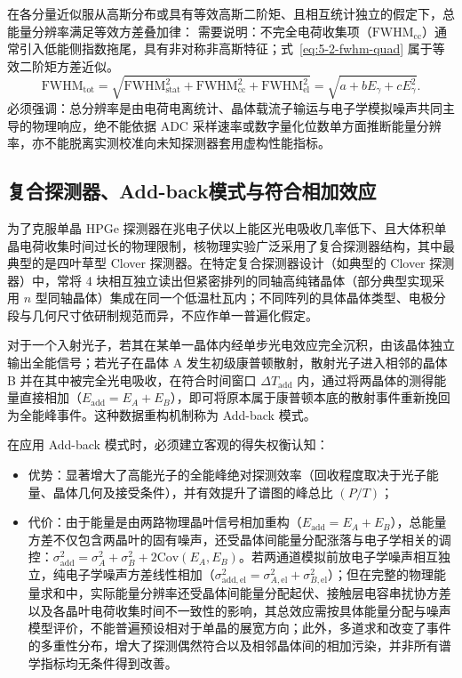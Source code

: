 在各分量近似服从高斯分布或具有等效高斯二阶矩、且相互统计独立的假定下，总能量分辨率满足等效方差叠加律：
需要说明：不完全电荷收集项（$\mathrm{FWHM}_{\mathrm{cc}}$）通常引入低能侧指数拖尾，具有非对称非高斯特征；式~\eqref{eq:5-2-fwhm-quad} 属于等效二阶矩方差近似。
\begin{equation}\label{eq:5-2-fwhm-quad}
\mathrm{FWHM}_{\mathrm{tot}} = \sqrt{\mathrm{FWHM}_{\mathrm{stat}}^2 + \mathrm{FWHM}_{\mathrm{cc}}^2 + \mathrm{FWHM}_{\mathrm{el}}^2} = \sqrt{a + b E_\gamma + c E_\gamma^2}.
\end{equation}
必须强调：总分辨率是由电荷电离统计、晶体载流子输运与电子学模拟噪声共同主导的物理响应，绝不能依据 ADC 采样速率或数字量化位数单方面推断能量分辨率，亦不能脱离实测校准向未知探测器套用虚构性能指标。

\subsection{复合探测器、Add-back模式与符合相加效应}\label{subsec:5-2-4}

为了克服单晶 HPGe 探测器在兆电子伏以上能区光电吸收几率低下、且大体积单晶电荷收集时间过长的物理限制，核物理实验广泛采用了复合探测器结构，其中最典型的是四叶草型 Clover 探测器。在特定复合探测器设计（如典型的 Clover 探测器）中，常将 4 块相互独立读出但紧密排列的同轴高纯锗晶体（部分典型实现采用 $n$ 型同轴晶体）集成在同一个低温杜瓦内；不同阵列的具体晶体类型、电极分段与几何尺寸依研制规范而异，不应作单一普遍化假定。

对于一个入射光子，若其在某单一晶体内经单步光电效应完全沉积，由该晶体独立输出全能信号；若光子在晶体 A 发生初级康普顿散射，散射光子进入相邻的晶体 B 并在其中被完全光电吸收，在符合时间窗口 $\Delta T_{\mathrm{add}}$ 内，通过将两晶体的测得能量直接相加（$E_{\mathrm{add}} = E_A + E_B$），即可将原本属于康普顿本底的散射事件重新挽回为全能峰事件。这种数据重构机制称为 Add-back 模式。

在应用 Add-back 模式时，必须建立客观的得失权衡认知：
\begin{itemize}
\item 优势：显著增大了高能光子的全能峰绝对探测效率（回收程度取决于光子能量、晶体几何及接受条件），并有效提升了谱图的峰总比 $(P/T)$；
\item 代价：由于能量是由两路物理晶叶信号相加重构（$E_{\mathrm{add}} = E_A + E_B$），总能量方差不仅包含两晶叶的固有噪声，还受晶体间能量分配涨落与电子学相关的调控：$\sigma_{\mathrm{add}}^2 = \sigma_A^2 + \sigma_B^2 + 2\mathrm{Cov}(E_A, E_B)$。若两通道模拟前放电子学噪声相互独立，纯电子学噪声方差线性相加（$\sigma_{\mathrm{add, el}}^2 = \sigma_{A, \mathrm{el}}^2 + \sigma_{B, \mathrm{el}}^2$）；但在完整的物理能量求和中，实际能量分辨率还受晶体间能量分配起伏、接触层电容串扰协方差以及各晶叶电荷收集时间不一致性的影响，其总效应需按具体能量分配与噪声模型评价，不能普遍预设相对于单晶的展宽方向；此外，多道求和改变了事件的多重性分布，增大了探测偶然符合以及相邻晶体间的相加污染，并非所有谱学指标均无条件得到改善。
\end{itemize}

